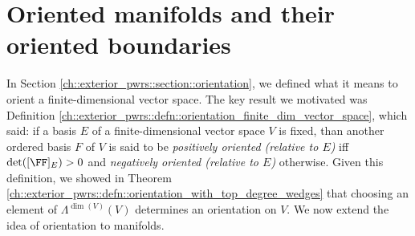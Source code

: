 
\newpage

\section{Oriented manifolds and their oriented boundaries}

In Section \ref{ch::exterior_pwrs::section::orientation}, we defined what it means to orient a finite-dimensional vector space. The key result we motivated was Definition \ref{ch::exterior_pwrs::defn::orientation_finite_dim_vector_space}, which said: if a basis $E$ of a finite-dimensional vector space $V$ is fixed, than another ordered basis $F$ of $V$ is said to be \textit{positively oriented (relative to $E$)} iff $\det([\FF]_E) > 0$ and \textit{negatively oriented (relative to $E$)} otherwise. Given this definition, we showed in Theorem \ref{ch::exterior_pwrs::defn::orientation_with_top_degree_wedges} that choosing an element of $\Lambda^{\dim(V)}(V)$ determines an orientation on $V$. We now extend the idea of orientation to manifolds.


